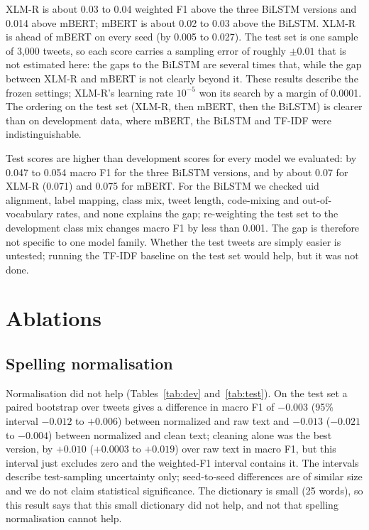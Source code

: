 XLM-R is about 0.03 to 0.04 weighted F1 above the three BiLSTM versions and 0.014 above mBERT; mBERT is about 0.02 to 0.03 above the BiLSTM. XLM-R is ahead of mBERT on every seed (by 0.005 to 0.027). The test set is one sample of 3{,}000 tweets, so each score carries a sampling error of roughly $\pm0.01$ that is not estimated here: the gaps to the BiLSTM are several times that, while the gap between XLM-R and mBERT is not clearly beyond it. These results describe the frozen settings; XLM-R's learning rate $10^{-5}$ won its search by a margin of 0.0001. The ordering on the test set (XLM-R, then mBERT, then the BiLSTM) is clearer than on development data, where mBERT, the BiLSTM and TF-IDF were indistinguishable.

Test scores are higher than development scores for every model we evaluated: by 0.047 to 0.054 macro F1 for the three BiLSTM versions, and by about 0.07 for XLM-R (0.071) and 0.075 for mBERT. For the BiLSTM we checked uid alignment, label mapping, class mix, tweet length, code-mixing and out-of-vocabulary rates, and none explains the gap; re-weighting the test set to the development class mix changes macro F1 by less than 0.001. The gap is therefore not specific to one model family. Whether the test tweets are simply easier is untested; running the TF-IDF baseline on the test set would help, but it was not done.

\section{Ablations}
\subsection{Spelling normalisation}
Normalisation did not help (Tables~\ref{tab:dev} and~\ref{tab:test}). On the test set a paired bootstrap over tweets gives
a difference in macro F1 of $-0.003$ (95\% interval $-0.012$ to $+0.006$) between normalized and raw text and
$-0.013$ ($-0.021$ to $-0.004$) between normalized and clean text; cleaning alone was the best version, by $+0.010$
($+0.0003$ to $+0.019$) over raw text in macro F1, but this interval just excludes zero and the weighted-F1 interval
contains it. The intervals describe test-sampling uncertainty only; seed-to-seed differences are of similar size and we
do not claim statistical significance. The dictionary is small (25 words), so this result says that this small dictionary
did not help, and not that spelling normalisation cannot help.

